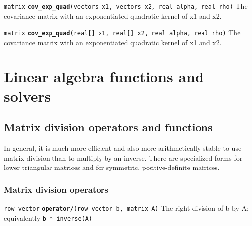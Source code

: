 \documentclass[
  10pt,
]{book}
\begin{document}

\texttt{matrix} \textbf{\texttt{cov\_exp\_quad}}\texttt{(vectors\ x1,\ vectors\ x2,\ real\ alpha,\ real\ rho)}\newline
The covariance matrix with an exponentiated quadratic kernel of x1 and
x2.


\texttt{matrix} \textbf{\texttt{cov\_exp\_quad}}\texttt{(real{[}{]}\ x1,\ real{[}{]}\ x2,\ real\ alpha,\ real\ rho)}\newline
The covariance matrix with an exponentiated quadratic kernel of x1 and
x2.

\hypertarget{linear-algebra-functions-and-solvers}{%
\section{Linear algebra functions and solvers}\label{linear-algebra-functions-and-solvers}}

\hypertarget{matrix-division-operators-and-functions}{%
\subsection{Matrix division operators and functions}\label{matrix-division-operators-and-functions}}

In general, it is much more efficient and also more arithmetically
stable to use matrix division than to multiply by an inverse. There
are specialized forms for lower triangular matrices and for symmetric,
positive-definite matrices.

\hypertarget{matrix-division-operators}{%
\subsubsection{Matrix division operators}\label{matrix-division-operators}}


\texttt{row\_vector} \textbf{\texttt{operator/}}\texttt{(row\_vector\ b,\ matrix\ A)}\newline
The right division of b by A; equivalently \texttt{b\ *\ inverse(A)}

\end{document}
